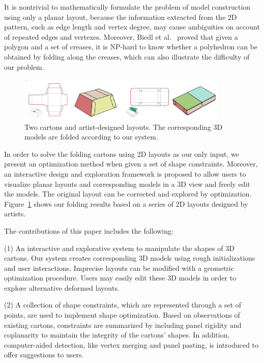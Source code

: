 It is nontrivial to mathematically formulate the problem of model construction using only a planar layout, because the information extracted from the 2D pattern, such as edge length and vertex degree, may cause ambiguities on account of repeated edges and vertexes. 
Moreover, Biedl et al.~\cite{Biedl:2005:NFP:1090462.1646553} proved that given a polygon and a set of creases, it is NP-hard to know whether a polyhedron can be obtained by folding along the creases, which can also illustrate the difficulty of our problem.

\begin{figure}
	\centering
	\includegraphics[width=0.9\textwidth]{images/artist}
	\caption{Two cartons and artist-designed layouts. The corresponding 3D models are folded according to our system.}
	\label{fig:artist}
\end{figure}

 
 
In order to solve the folding cartons using 2D layouts as our only input, we present an optimization method when given a set of shape constraints.
Moreover, an interactive design and exploration framework is proposed to allow users to visualize planar layouts and corresponding models in a 3D view and freely edit the models. 
The original layout can be corrected and explored by optimization. Figure~\ref{fig:artist} shows our folding results based on a series of 2D layouts designed by artists. 

The contributions of this paper includes the following:

(1) An interactive and explorative system to manipulate the shapes of 3D cartons. Our system creates corresponding 3D models using rough initializations and user interactions. Imprecise layouts can be modified with a geometric optimization procedure. Users may easily edit these 3D models in order to explore alternative deformed layouts.

(2) A collection of shape constraints, which are represented through a set of points, are used to implement shape optimization. Based on observations of existing cartons, constraints are summarized by including panel rigidity and coplanarity to maintain the integrity of the cartons' shapes. 
In addition, computer-aided detection, like vertex merging and panel pasting, is introduced to offer suggestions to users. 